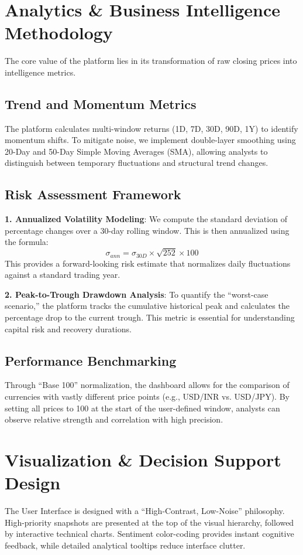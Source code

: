 \documentclass[conference]{IEEEtran}
\begin{document}
\section{Analytics \& Business Intelligence Methodology}

The core value of the platform lies in its transformation of raw closing prices into intelligence metrics.

\subsection{Trend and Momentum Metrics}
The platform calculates multi-window returns (1D, 7D, 30D, 90D, 1Y) to identify momentum shifts. To mitigate noise, we implement double-layer smoothing using 20-Day and 50-Day Simple Moving Averages (SMA), allowing analysts to distinguish between temporary fluctuations and structural trend changes.

\subsection{Risk Assessment Framework}
\textbf{1. Annualized Volatility Modeling}: We compute the standard deviation of percentage changes over a 30-day rolling window. This is then annualized using the formula:
\begin{equation}
\sigma_{ann} = \sigma_{30D} \times \sqrt{252} \times 100
\end{equation}
This provides a forward-looking risk estimate that normalizes daily fluctuations against a standard trading year.

\textbf{2. Peak-to-Trough Drawdown Analysis}: To quantify the ``worst-case scenario,'' the platform tracks the cumulative historical peak and calculates the percentage drop to the current trough. This metric is essential for understanding capital risk and recovery durations.

\subsection{Performance Benchmarking}
Through ``Base 100'' normalization, the dashboard allows for the comparison of currencies with vastly different price points (e.g., USD/INR vs. USD/JPY). By setting all prices to 100 at the start of the user-defined window, analysts can observe relative strength and correlation with high precision.

\section{Visualization \& Decision Support Design}
The User Interface is designed with a ``High-Contrast, Low-Noise'' philosophy. High-priority snapshots are presented at the top of the visual hierarchy, followed by interactive technical charts. Sentiment color-coding provides instant cognitive feedback, while detailed analytical tooltips reduce interface clutter.
\end{document}
